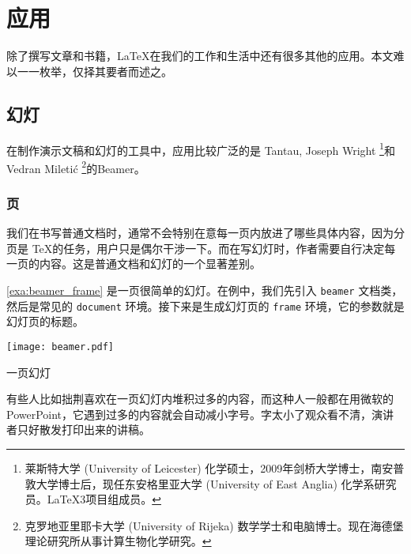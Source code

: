 \chapter{应用}

除了撰写文章和书籍，\LaTeX 在我们的工作和生活中还有很多其他的应用。本文难以一一枚举，仅择其要者而述之。

\section{幻灯}

在制作演示文稿和幻灯的工具中，应用比较广泛的是 Tantau\indexTantau, Joseph Wright\indexWright{} \footnote{莱斯特大学 (University of Leicester) 化学硕士，2009年剑桥大学博士，南安普敦大学博士后，现任东安格里亚大学 (University of East Anglia) 化学系研究员。\LaTeX{}3项目组成员。}和 Vedran Miletić\indexMiletic{} \footnote{克罗地亚里耶卡大学 (University of Rijeka) 数学学士和电脑博士。现在海德堡理论研究所从事计算生物化学研究。}的Beamer\citep{Tantau_beamer}。

\subsection{页}

我们在书写普通文档时，通常不会特别在意每一页内放进了哪些具体内容，因为分页是 \TeX 的任务，用户只是偶尔干涉一下。而在写幻灯时，作者需要自行决定每一页的内容。这是普通文档和幻灯的一个显著差别。

\autoref{exa:beamer_frame} 是一页很简单的幻灯。在例中，我们先引入 \texttt{beamer} 文档类，然后是常见的 \texttt{document} 环境。接下来是生成幻灯页的 \texttt{frame} 环境，它的参数就是幻灯页的标题。


\begin{example}[htbp]
\begin{Demo}
\centering
\texttt{[image: beamer.pdf]}
\end{Demo}
\caption{一页幻灯}
\label{exa:beamer_frame}
\end{example}

有些人比如拙荆喜欢在一页幻灯内堆积过多的内容，而这种人一般都在用微软的 PowerPoint，它遇到过多的内容就会自动减小字号。字太小了观众看不清，演讲者只好散发打印出来的讲稿。

